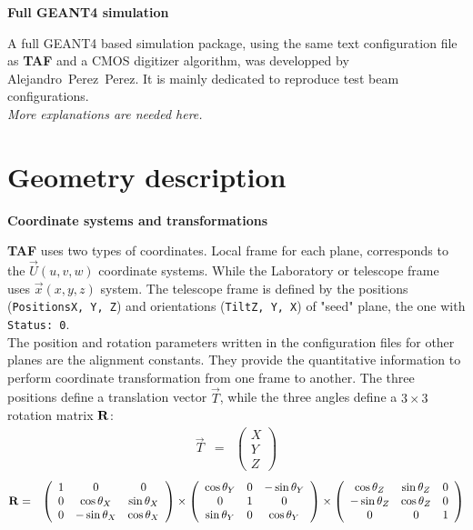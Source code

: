\documentclass[a4paper, 12pt, twoside]{article}
\newcommand{\TAF}{{\bf TAF }}
\begin{document}
\vspace{0.8 cm}

\noindent
{\bf Full GEANT4 simulation}

\noindent
A full GEANT4 based simulation package, using the same text configuration file as \TAF and a CMOS digitizer algorithm, was developped by Alejandro~Perez~Perez. It is mainly dedicated to reproduce test beam configurations.\\
{\it More explanations are needed here.}

\vspace{2cm}

\section{Geometry description}
\label{secGeometry}

\noindent
{\bf Coordinate systems and transformations}

\noindent
\TAF uses two types of coordinates. Local frame for each plane, corresponds to the $\vec{U}(u, v, w)$ coordinate systems. While the Laboratory or telescope frame uses $\vec{x}(x, y, z)$ system. The telescope frame is defined by the positions ({\tt PositionsX, Y, Z}) and orientations ({\tt TiltZ, Y, X}) of "seed" plane, the one with {\tt Status: 0}.\\

\noindent
The position and rotation parameters written in the configuration files for other planes are the alignment constants. They provide the quantitative information to perform coordinate transformation from one frame to another. The three positions define a translation vector $\vec{T}$, while the three angles define a $3\times3$ rotation matrix ${\bf R}$:
\begin{eqnarray*}
\vec{T} &=& \left( \begin{array}{c} X \\ Y \\ Z \end{array} \right)
\end{eqnarray*}
\begin{eqnarray*}
{\bf R} &=& 
\left( \begin{array}{ccc} 
1 & 0 & 0 \\ 0 & \cos{\theta_{X}} & \sin{\theta_{X}} \\ 0 & -\sin{\theta_{X}} & \cos{\theta_{X}}
\end{array} \right)
\times
\left( \begin{array}{ccc} 
\cos{\theta_{Y}} & 0 & -\sin{\theta_{Y}} \\ 0 & 1 & 0 \\ \sin{\theta_{Y}} & 0 & \cos{\theta_{Y}}
\end{array} \right)
\times
\left( \begin{array}{ccc}
\cos{\theta_{Z}} & \sin{\theta_{Z}} & 0 \\ -\sin{\theta_{Z}} & \cos{\theta_{Z}} & 0 \\ 0 & 0 & 1
\end{array} \right) 
\end{eqnarray*}
\end{document}
